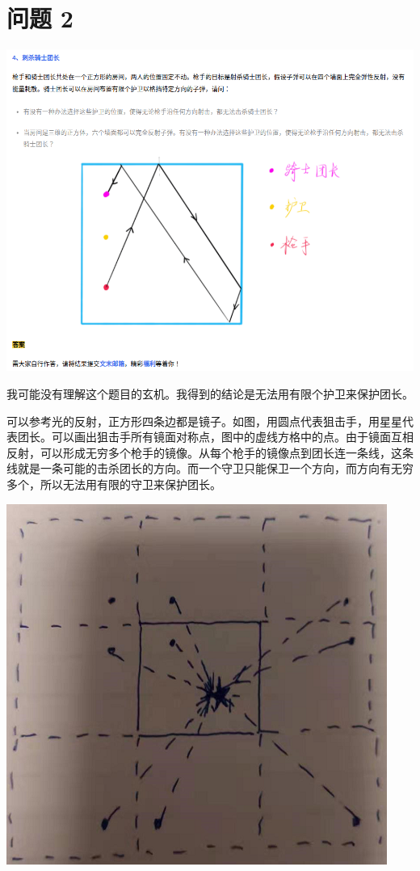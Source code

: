 \documentclass{article}
\begin{document}
\section{问题 2}
\includegraphics[scale=0.5]{knight.png}

我可能没有理解这个题目的玄机。我得到的结论是无法用有限个护卫来保护团长。

可以参考光的反射，正方形四条边都是镜子。如图，用圆点代表狙击手，用星星代表团长。可以画出狙击手所有镜面对称点，图中的虚线方格中的点。由于镜面互相反射，可以形成无穷多个枪手的镜像。从每个枪手的镜像点到团长连一条线，这条线就是一条可能的击杀团长的方向。而一个守卫只能保卫一个方向，而方向有无穷多个，所以无法用有限的守卫来保护团长。

\includegraphics[scale=0.5]{mirror.png}
\end{document}
